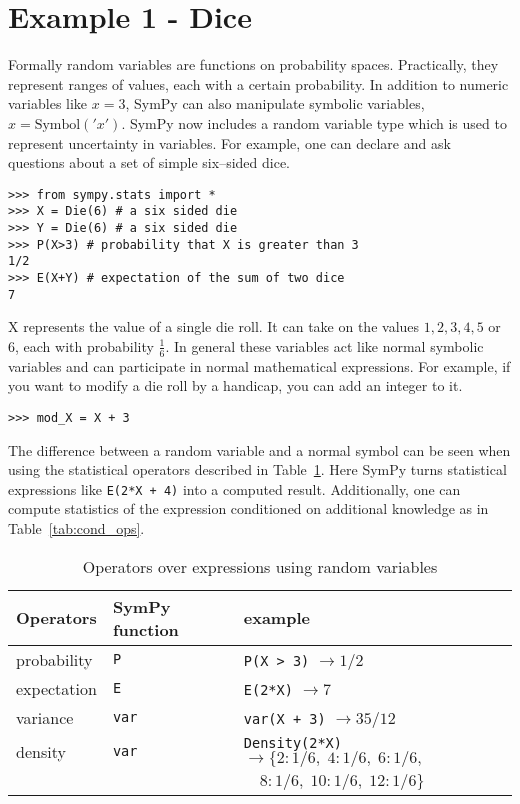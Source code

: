 \section{Example 1 - Dice}

Formally random variables are functions on probability spaces.  Practically,
they represent ranges of values, each with a certain probability.  In addition
to numeric variables like $x = 3$, SymPy can also manipulate symbolic
variables, $x = \text{Symbol}('x')$. SymPy now includes a random variable type
which is used to represent uncertainty in variables.  For example, one can
declare and ask questions about a set of simple six--sided dice.

\begin{lstlisting}
>>> from sympy.stats import *
>>> X = Die(6) # a six sided die
>>> Y = Die(6) # a six sided die
>>> P(X>3) # probability that X is greater than 3
1/2
>>> E(X+Y) # expectation of the sum of two dice
7
\end{lstlisting}

X represents the value of a single die roll. It can take on the values
$1,2,3,4,5$ or $6$, each with probability $\frac{1}{6}$. In general these
variables act like normal symbolic variables and can participate in normal
mathematical expressions. For example, if you want to modify a die roll by a
handicap, you can add an integer to it.

\begin{lstlisting}
>>> mod_X = X + 3
\end{lstlisting}

The difference between a random variable and a normal symbol can be seen when
using the statistical operators described in Table~\ref{tab:stat_ops}.  Here
SymPy turns statistical expressions like {\tt E(2*X + 4)} into a computed
result. Additionally, one can compute statistics of the expression conditioned
on additional knowledge as in Table~\ref{tab:cond_ops}.

\begin{table}[h]
\begin{tabular}{|lll|}
\hline
Operators & SymPy function & example\\ \hline
probability & {\tt P} & {\tt P(X > 3)}  $\rightarrow 1/2$\\ \hline
expectation & {\tt E} & {\tt E(2*X)} $\rightarrow 7$ \\ \hline
variance & {\tt var} & {\tt var(X + 3)} $\rightarrow 35/12$\\ \hline
density & {\tt var} & {\tt Density(2*X)}  $\rightarrow \{2: 1/6,\; 4: 1/6,\; 6: 1/6,$ \\
            & & \phantom{Density(X+3) $\rightarrow$} $\quad 8: 1/6,\; 10: 1/6,\; 12: 1/6\}$ \\ \hline
\end{tabular}
\label{tab:stat_ops}
\caption{Operators over expressions using random variables}
\end{table}

